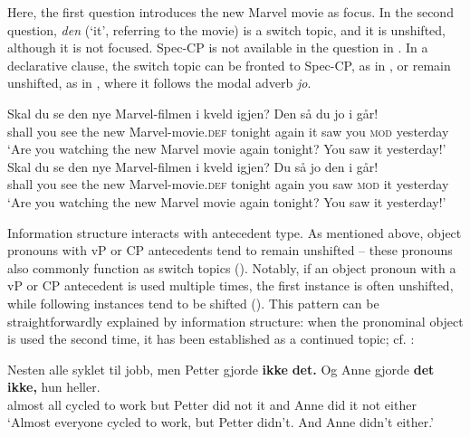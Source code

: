 \documentclass[output=paper]{langscibook}
\begin{document}
Here, the first question introduces the new Marvel movie as focus. In the second question, \textit{den} (‘it’, referring to the movie) is a switch topic, and it is unshifted, although it is not focused. Spec-CP is not available in the question in . In a declarative clause, the switch topic can be fronted to Spec-CP, as in , or remain unshifted, as in , where it follows the modal adverb \textit{jo}.

\ea\label{ex:larsson:18}%
    \ea \label{ex:larsson:18a}
    \gll Skal du se den nye Marvel-filmen {i kveld} igjen? Den så du jo {i går}!\\
         shall you see the new Marvel-movie.\textsc{def} tonight again it saw you \textsc{mod} yesterday\\
    \glt ‘Are you watching the new Marvel movie again tonight? You saw it yesterday!’
    \ex \label{ex:larsson:18b}
    \gll Skal du se den nye Marvel-filmen {i kveld} igjen? Du så jo den {i går}!\\
         shall you see the new Marvel-movie.\textsc{def} tonight again you saw \textsc{mod} it yesterday \\
    \glt ‘Are you watching the new Marvel movie again tonight? You saw it yesterday!’
    \z %
\z

Information structure interacts with antecedent type. As mentioned above, object pronouns with vP or CP antecedents tend to remain unshifted – these pronouns also commonly function as switch topics (\citealt{BentzenAnderssen2019, LindahlEngdahl2022}). Notably, if an object pronoun with a vP or CP antecedent is used multiple times, the first instance is often unshifted, while following instances tend to be shifted (\citealt{BentzenAnderssen2019}). This pattern can be straightforwardly explained by information structure: when the pronominal object is used the second time, it has been established as a continued topic; cf. :

\ea%
    \label{ex:larsson:19}
    \gll Nesten alle syklet til jobb, men Petter gjorde \textbf{ikke} \textbf{det.} Og Anne gjorde \textbf{det}   \textbf{ikke,} hun heller. \\
         almost all cycled to work but Petter did not it and Anne did it not either\\
    \glt ‘Almost everyone cycled to work, but Petter didn’t. And Anne didn’t either.’
\z %
\end{document}
